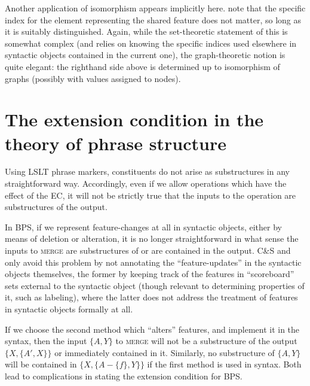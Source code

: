 \documentclass[output=paper]{langsci/langscibook}
\begin{document}
Another application of isomorphism appears implicitly here.
\citeauthor{frampton2000agreement} note that the specific index for the element
representing the shared feature does not matter, so long as it is suitably
distinguished. Again, while the set-theoretic statement of this is somewhat
complex (and relies on knowing the specific indices used elsewhere in syntactic
objects contained in the current one), the graph-theoretic notion is quite
elegant: the righthand side above is determined up to isomorphism of graphs
(possibly with values assigned to nodes).

\section{The extension condition in the theory of phrase structure}

Using LSLT phrase markers, constituents
do not arise as substructures in any straightforward way. Accordingly, even if
we allow operations which have the effect of the \gls{EC}, it will not be strictly true that the inputs to the operation are
substructures of the output.

In \gls{BPS}, if we represent feature-changes at all
in syntactic objects, either by means of deletion or alteration, it is no
longer straightforward in what sense the inputs to \textsc{merge} are
substructures of or are contained in the output.  C\&S and
\citet{Chomsky2000} only avoid this problem by not annotating the
\enquote{feature-updates} in the syntactic objects themselves, the former by
keeping track of the features in \enquote{scoreboard} sets external to the
syntactic object (though relevant to determining properties of it, such as
labeling), where the latter does not address the treatment of features in
syntactic objects formally at all.

If we choose the second method which \enquote{alters} features, and implement it in
the syntax, then the input $\{A,Y\}$ to \textsc{merge} will not be a
substructure of the output $\{X,\{A',X\}\}$ or immediately contained in it.
Similarly, no substructure of $\{A,Y\}$ will be contained in
$\{X,\{A-\{f\},Y\}\}$ if the first method is used in syntax. Both lead to
complications in stating the extension condition for \gls{BPS}.
\end{document}
